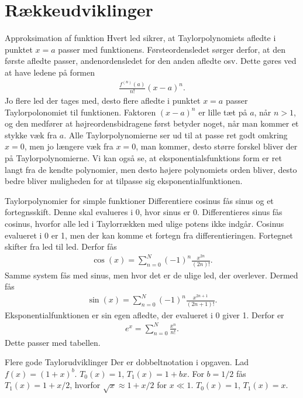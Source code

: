 \section*{Rækkeudviklinger}
\begin{opgave}[1]{Approksimation af funktion}
\opg Hvert led sikrer, at Taylorpolynomiets afledte i punktet $x=a$ passer med funktionens. Førsteordensledet sørger derfor, at den første afledte passer, andenordensledet for den anden afledte osv. Dette gøres ved at have ledene på formen
%
\begin{align*}
    \frac{f^{(n)}(a)}{n!}(x-a)^n.
\end{align*}
%
\opg Jo flere led der tages med, desto flere afledte i punktet $x=a$ passer Taylorpolonomiet til funktionen.
%
\opg Faktoren $(x-a)^n$ er lille tæt på $a$, når $n > 1$, og den medfører at højreordensbidragene først betyder noget, når man kommer et stykke væk fra $a$.
%
\opg Alle Taylorpolynomierne ser ud til at passe ret godt omkring $x = 0$, men jo længere væk fra $x=0$, man kommer, desto større forskel bliver der på Taylorpolynomierne. Vi kan også se, at eksponentialsfunktions form er ret langt fra de kendte polynomier, men desto højere polynomiets orden bliver, desto bedre bliver muligheden for at tilpasse sig eksponentialfunktionen.
\end{opgave}	
\begin{opgave}[2]{Taylorpolynomier for simple funktioner}
\opg Differentiere cosinus fås sinus og et fortegnsskift. Denne skal evalueres i 0, hvor sinus er 0. Differentieres sinus fås cosinus, hvorfor alle led i Taylorrækken med ulige potens ikke indgår. Cosinus evalueret i 0 er 1, men der kan komme et fortegn fra differentieringen. Fortegnet skifter fra led til led. Derfor fås
%
\begin{align*}
    \cos(x) = \sum_{n=0}^{N} (-1)^n \frac{x^{2n}}{(2n)!}.
\end{align*}
%
\opg Samme system fås med sinus, men hvor det er de ulige led, der overlever. Dermed fås
%
\begin{align*}
    \sin(x) = \sum_{n=0}^{N} (-1)^n \frac{x^{2n+1}}{(2n+1)!}.
\end{align*}
%
\opg Eksponentialfunktionen er sin egen afledte, der evalueret i 0 giver 1. Derfor er
%
\begin{align*}
    e^{x} = \sum_{n=0}^{N} \frac{x^n}{n!}.
\end{align*}
%
\opg Dette passer med tabellen.
\end{opgave}
\begin{opgave}[3]{Flere gode Taylorudviklinger}
Der er dobbeltnotation i opgaven. Lad $f(x) = (1+x)^b$.
%
\opg $T_0(x) = 1$, $T_1(x) = 1 + bx$.
%
\opg For $b = 1/2$ fås $T_1(x) = 1 + x/2$, hvorfor $\sqrt{x} \approx 1 + x/2$ for $x \ll 1$.
%
\opg $T_0(x) = 1$, $T_1(x) = x$.
\end{opgave}